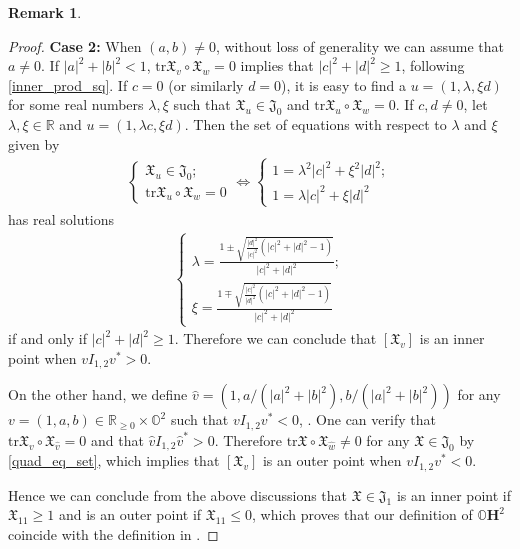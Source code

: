 \documentclass{article}
\newcommand{\OO}{\mathbb{O}}
\newcommand{\RR}{\mathbb{R}}
\newcommand{\tr}{\mathrm{tr}}
\newcommand{\FFJ}{\mathfrak{J}}
\newcommand{\FFX}{\mathfrak{X}}
\theoremstyle{definition}
\newtheorem*{rmk}{Remark}
\begin{document}
\begin{rmk}
\begin{proof}
\textbf{Case 2:} When $(a,b)\neq0$, without loss of generality we can assume that $a\neq 0$. If $|a|^2+|b|^2<1$, $\tr\FFX_v\circ\FFX_w=0$ implies that $|c|^2+|d|^2\geq 1$, following \eqref{inner_prod_sq}. If $c=0$ (or similarly $d=0$), it is easy to find a $u=(1,\lambda,\xi d)$ for some real numbers $\lambda,\xi$ such that $\FFX_u\in\FFJ_0$ and $\tr \FFX_u\circ\FFX_w=0$. If $c,d\neq 0$, let $\lambda,\xi\in\RR$ and $u=(1,\lambda c,\xi d)$. Then the set of equations with respect to $\lambda$ and $\xi$ given by
\begin{align}\label{quad_eq_set}
\begin{cases}
\displaystyle  \FFX_u\in\FFJ_0;\\
\displaystyle  \tr\FFX_u\circ\FFX_w=0
\end{cases}
\Longleftrightarrow
\begin{cases}
\displaystyle  1=\lambda^2|c|^2+\xi^2|d|^2;\\
\displaystyle  1=\lambda|c|^2+\xi|d|^2
\end{cases}
\end{align}
has real solutions
\begin{align*}
\begin{cases}
\displaystyle  \lambda=\frac{1\pm\sqrt{\frac{|d|^2}{|c|^2}(|c|^2+|d|^2-1)}}{|c|^2+|d|^2};\\
\displaystyle  \xi=\frac{1\mp\sqrt{\frac{|c|^2}{|d|^2}(|c|^2+|d|^2-1)}}{|c|^2+|d|^2}
\end{cases}
\end{align*}
if and only if $|c|^2+|d|^2\geq 1$. Therefore we can conclude that $[\FFX_v]$ is an inner point when $vI_{1,2}v^*>0$. 

On the other hand, we define $\widehat{v}=(1,a/(|a|^2+|b|^2),b/(|a|^2+|b|^2))$ for any $v=(1,a,b)\in\RR_{\geq 0}\times\OO^2$ such that $vI_{1,2}v^*<0$, . One can verify that $\tr\FFX_v\circ\FFX_{\widehat{v}}=0$ and that $\widehat{v}I_{1,2}\widehat{v}^*>0$. Therefore $\tr\FFX\circ\FFX_{\widehat{w}}\neq 0$ for any $\FFX\in\FFJ_0$ by \eqref{quad_eq_set}, which implies that $[\FFX_v]$ is an outer point when $vI_{1,2}v^*<0$. 

Hence we can conclude from the above discussions that $\FFX\in\FFJ_1$ is an inner point if $\FFX_{11}\geq 1$ and is an outer point if $\FFX_{11}\leq 0$, which proves that our definition of $\OO\mathbf{H}^2$ coincide with the definition in \cite[\S19. Spaces of $\RR$-rank 1]{Mostow73}.
\end{proof} \fi

\end{rmk}
\end{document}

